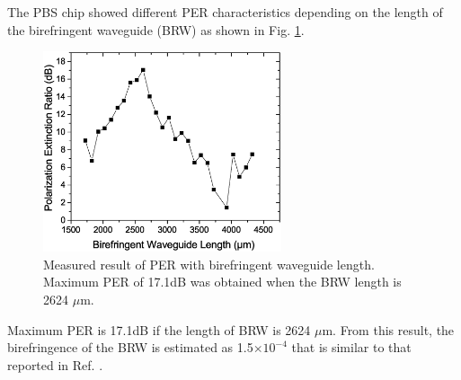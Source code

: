 \documentclass[letterpaper, 10pt]{article}
\begin{document}
The PBS chip showed different PER characteristics depending on the length of the birefringent waveguide (BRW) as shown in Fig. \ref{fig:BRW-PER}.
\begin{figure}
  \centering
  \includegraphics[width=7cm]{./BRWPER}
  \caption{Measured result of PER with birefringent waveguide length. Maximum PER of 17.1dB was obtained when the BRW length is 2624 $\mu$m.}
  \label{fig:BRW-PER}
\end{figure}
Maximum PER is 17.1dB  if the length of BRW is 2624 $\mu$m.
From this result, the birefringence of the BRW is estimated as 1.5$\times 10^{-4}$ that is similar to that reported in Ref. \cite{Hashizume:2015ta}.

\end{document}
